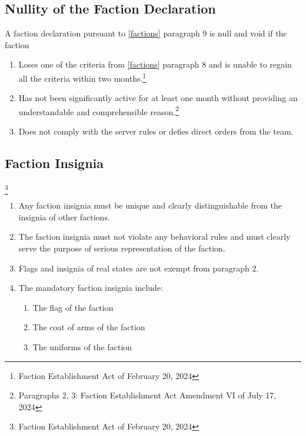 \documentclass{article}
\begin{document}
\subsection{Nullity of the Faction Declaration}
A faction declaration pursuant to \ref{factions} paragraph 9 is null and void if the faction
\begin{enumerate}
	\item Loses one of the criteria from \ref{factions} paragraph 8 and is unable to regain all the criteria within two months.\footnote{Faction Establishment Act of February 20, 2024}
	\item Has not been significantly active for at least one month without providing an understandable and comprehensible reason.\footnote{Paragraphs 2, 3: Faction Establishment Act Amendment VI of July 17, 2024}
	\item Does not comply with the server rules or defies direct orders from the team.
\end{enumerate}

\subsection{Faction Insignia}\footnote{Faction Establishment Act of February 20, 2024}
\begin{enumerate}[(1)]
    \item Any faction insignia must be unique and clearly distinguishable from the insignia of other factions.
    \item The faction insignia must not violate any behavioral rules and must clearly serve the purpose of serious representation of the faction.
    \item Flags and insignia of real states are not exempt from paragraph 2.
    \item The mandatory faction insignia include:
    \begin{enumerate}[1.]
        \item The flag of the faction
        \item The coat of arms of the faction
        \item The uniforms of the faction
    \end{enumerate}
\end{enumerate}
\end{document}
